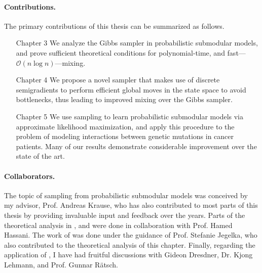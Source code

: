 \newpage
\paragraph{Contributions.} The primary contributions of this thesis can be summarized as follows.
\begin{itemize}[leftmargin=3.5em]
\item[\textsf{Chapter 3}] We analyze the Gibbs sampler in probabilistic submodular models, and prove sufficient theoretical conditions for polynomial-time, and fast---$\mathcal{O}(n\log n)$---mixing.
\item[\textsf{Chapter 4}] We propose a novel sampler that makes use of discrete semigradients to perform efficient global moves in the state space to avoid bottlenecks, thus leading to improved mixing over the Gibbs sampler.
\item[\textsf{Chapter 5}] We use sampling to learn probabilistic submodular models via approximate likelihood maximization, and apply this procedure to the problem of modeling interactions between genetic mutations in cancer patients.
Many of our results demonstrate considerable improvement over the state of the art.
\end{itemize}

\paragraph{Collaborators.}
The topic of sampling from probabilistic submodular models was conceived by my advisor, Prof. Andreas Krause, who has also contributed to most parts of this thesis by providing invaluable input and feedback over the years.
Parts of the theoretical analysis in , and  were done in collaboration with Prof. Hamed Hassani.
The work of  was done under the guidance of Prof. Stefanie Jegelka, who also contributed to the theoretical analysis of this chapter.
Finally, regarding the application of , I have had fruitful discussions with Gideon Dresdner, Dr. Kjong Lehmann, and Prof. Gunnar Rätsch.